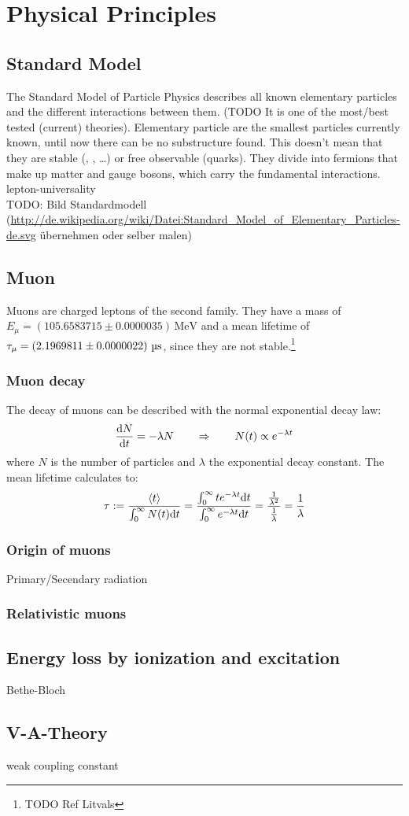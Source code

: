 \section{Physical Principles}
\subsection{Standard Model}
The Standard Model of Particle Physics describes all known elementary particles and the different interactions between them. 
(TODO It is one of the most/best tested (current) theories). Elementary particle are the smallest particles currently known, until now 
there can be no substructure found. This doesn't mean that they are stable (\textmu, \texttau, \ldots) or free observable (quarks). They divide into fermions that make up matter and 
gauge bosons, which carry the fundamental interactions.\\
lepton-universality\\
TODO: Bild Standardmodell (\url{http://de.wikipedia.org/wiki/Datei:Standard_Model_of_Elementary_Particles-de.svg} übernehmen oder selber malen)
\subsection{Muon}
Muons are charged leptons of the second family. They have a mass of $E_\mu = (105.6583715 \pm 0.0000035)\,\text{MeV}$ and a mean lifetime of 
$\tau_\mu = \left( 2.1969811 \pm 0.0000022 \right)\,\text{\textmu s}$, since they are not stable.\footnote{TODO Ref Litvals} %
\subsubsection{Muon decay}
\label{sub:decay}
The decay of muons can be described with the normal exponential decay law:
\begin{equation}
	\frac{\mathrm{d} N}{\mathrm{d} t} = - \lambda N \qquad \Rightarrow \qquad N(t) \propto e^{-\lambda t}
\end{equation}
where $N$ is the number of particles and $\lambda$ the exponential decay constant. The mean lifetime calculates to:
\begin{equation}
    \tau := \frac{\left<t\right>}{\int_0^\infty N(t) \mathrm{d} t} = 
    \frac{\int_0^\infty t e^{-\lambda t} \mathrm{d} t}{\int_0^\infty e^{-\lambda t} \mathrm{d} t} = 
    \frac{\frac{1}{\lambda^2}}{\frac{1}{\lambda}} = \frac{1}{\lambda}
\end{equation}
\subsubsection{Origin of muons}
Primary/Secendary radiation
\subsubsection{Relativistic muons}
\subsection{Energy loss by ionization and excitation}
Bethe-Bloch
\subsection{V-A-Theory}
weak coupling constant